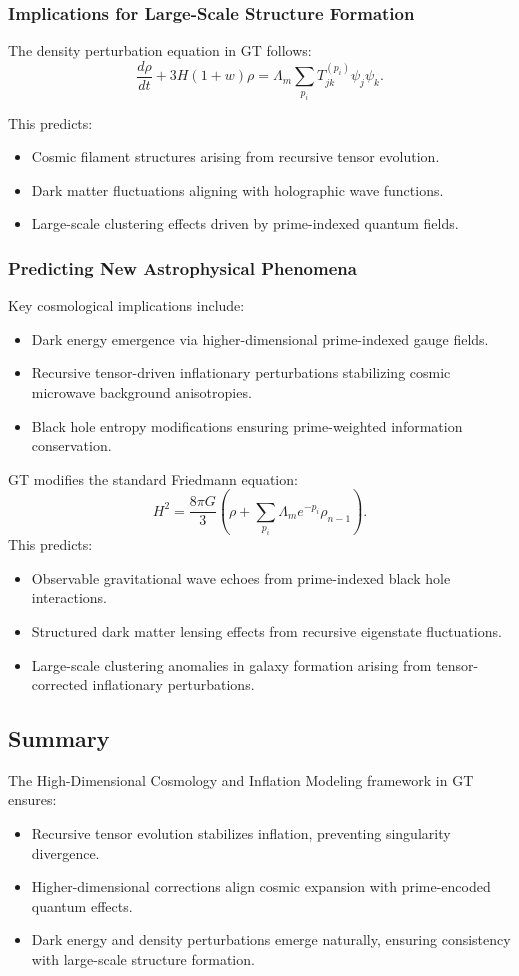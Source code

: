 \documentclass{article}
\theoremstyle{plain}
\begin{document}
\subsubsection{Implications for Large-Scale Structure Formation}
The density perturbation equation in GT follows:
\begin{equation}
\frac{d\rho}{dt} + 3H(1+w)\rho = \Lambda_m \sum_{p_i} T_{jk}^{(p_i)} \psi_j \psi_k.
\end{equation}

This predicts:
\begin{itemize}
\item Cosmic filament structures arising from recursive tensor evolution.
\item Dark matter fluctuations aligning with holographic wave functions.
\item Large-scale clustering effects driven by prime-indexed quantum fields.
\end{itemize}
\subsubsection{Predicting New Astrophysical Phenomena}
Key cosmological implications include:
\begin{itemize}
    \item Dark energy emergence via higher-dimensional prime-indexed gauge fields.
    \item Recursive tensor-driven inflationary perturbations stabilizing cosmic microwave background anisotropies.
    \item Black hole entropy modifications ensuring prime-weighted information conservation.
\end{itemize}
GT modifies the standard Friedmann equation:
\begin{equation}
    H^2 = \frac{8\pi G}{3} \left( \rho + \sum_{p_i} \Lambda_m e^{-p_i} \rho_{n-1} \right).
\end{equation}
This predicts:
\begin{itemize}
    \item Observable gravitational wave echoes from prime-indexed black hole interactions.
    \item Structured dark matter lensing effects from recursive eigenstate fluctuations.
    \item Large-scale clustering anomalies in galaxy formation arising from tensor-corrected inflationary perturbations.
\end{itemize}
\subsection{Summary}
The High-Dimensional Cosmology and Inflation Modeling framework in GT ensures:
\begin{itemize}
\item Recursive tensor evolution stabilizes inflation, preventing singularity divergence.
\item Higher-dimensional corrections align cosmic expansion with prime-encoded quantum effects.
\item Dark energy and density perturbations emerge naturally, ensuring consistency with large-scale structure formation.
\end{itemize}
\end{document}
